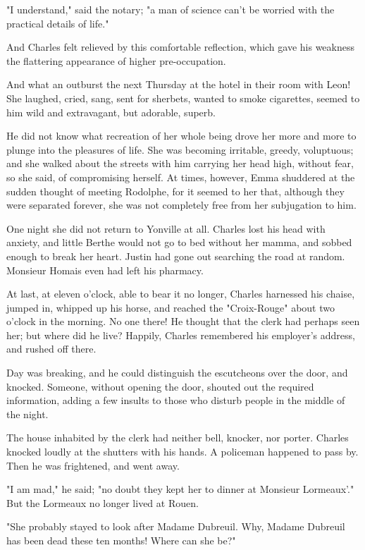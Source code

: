 \documentclass[11pt,twocolumn]{ltugboat}
\begin{document}
"I understand," said the notary; "a man of science can't be worried with
the practical details of life."

And Charles felt relieved by this comfortable reflection, which gave his
weakness the flattering appearance of higher pre-occupation.

And what an outburst the next Thursday at the hotel in their room with
Leon! She laughed, cried, sang, sent for sherbets, wanted to smoke
cigarettes, seemed to him wild and extravagant, but adorable, superb.

He did not know what recreation of her whole being drove her more and
more to plunge into the pleasures of life. She was becoming irritable,
greedy, voluptuous; and she walked about the streets with him carrying
her head high, without fear, so she said, of compromising herself.
At times, however, Emma shuddered at the sudden thought of meeting
Rodolphe, for it seemed to her that, although they were separated
forever, she was not completely free from her subjugation to him.

One night she did not return to Yonville at all. Charles lost his head
with anxiety, and little Berthe would not go to bed without her mamma,
and sobbed enough to break her heart. Justin had gone out searching the
road at random. Monsieur Homais even had left his pharmacy.

At last, at eleven o'clock, able to bear it no longer, Charles
harnessed his chaise, jumped in, whipped up his horse, and reached the
"Croix-Rouge" about two o'clock in the morning. No one there! He thought
that the clerk had perhaps seen her; but where did he live? Happily,
Charles remembered his employer's address, and rushed off there.

Day was breaking, and he could distinguish the escutcheons over the
door, and knocked. Someone, without opening the door, shouted out the
required information, adding a few insults to those who disturb people
in the middle of the night.

The house inhabited by the clerk had neither bell, knocker, nor porter.
Charles knocked loudly at the shutters with his hands. A policeman
happened to pass by. Then he was frightened, and went away.

"I am mad," he said; "no doubt they kept her to dinner at Monsieur
Lormeaux'." But the Lormeaux no longer lived at Rouen.

"She probably stayed to look after Madame Dubreuil. Why, Madame Dubreuil
has been dead these ten months! Where can she be?"
\end{document}
